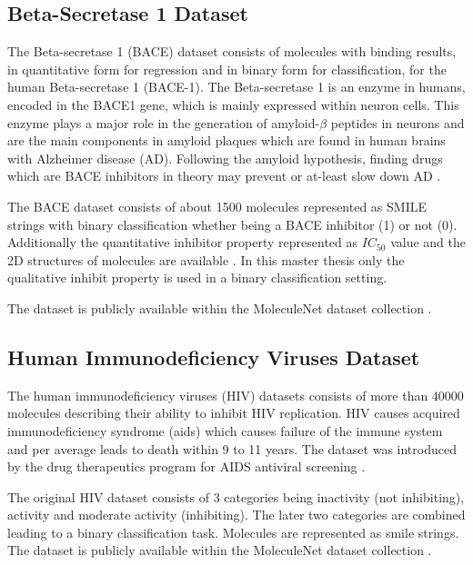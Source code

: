 \documentclass[../main.tex]{subfiles}
\begin{document}
\subsection{Beta-Secretase 1 Dataset} \label{ssec:bace}

The Beta-secretase 1 (BACE) dataset consists of molecules with binding results, in quantitative form for regression and in binary form for classification, for the human Beta-secretase 1 (BACE-1). The Beta-secretase 1 is an enzyme in humans, encoded in the BACE1 gene, which is mainly expressed within neuron cells. This enzyme plays a major role in the generation of amyloid-$\beta$ peptides in neurons and are the main components in amyloid plaques which are found in human brains with Alzheimer disease (AD). Following the amyloid hypothesis, finding drugs which are BACE inhibitors in theory may prevent or at-least slow down AD \cite{pradeepkiran_protective_2020}.

The BACE dataset consists of about 1500 molecules represented as SMILE strings with binary classification whether being a BACE inhibitor (1) or not (0). Additionally the quantitative inhibitor property represented as $IC_{50}$ value and the 2D structures of molecules are available \cite{subramanian_computational_2016}. In this master thesis only the qualitative inhibit property is used in a binary classification setting. 

The dataset is publicly available within the MoleculeNet dataset collection \cite{wu_moleculenet_2018}.

\subsection{Human Immunodeficiency Viruses Dataset}

The human immunodeficiency viruses (HIV) datasets consists of more than 40000 molecules describing their ability to inhibit HIV replication. HIV causes acquired immunodeficiency syndrome (\acs{aids}) which causes failure of the immune system and per average leads to death within 9 to 11 years\cite{noauthor_hiv_2021}. The dataset was introduced by the drug therapeutics program for AIDS antiviral screening \cite{noauthor_aids_nodate}.

The original HIV dataset consists of 3 categories being inactivity (not inhibiting), activity and moderate activity (inhibiting). The later two categories are combined leading to a binary classification task. Molecules are represented as smile strings. The dataset is publicly available within the MoleculeNet dataset collection \cite{wu_moleculenet_2018}.
\end{document}
